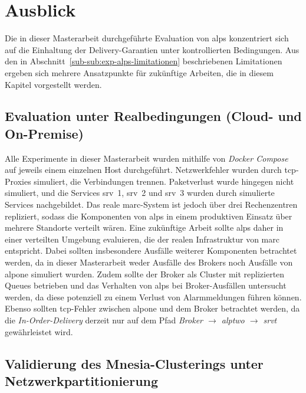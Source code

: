 \chapter{Ausblick}
\label{ch:ausblick}

Die in dieser Masterarbeit durchgeführte Evaluation von \gls{alps} konzentriert sich auf die Einhaltung der Delivery-Garantien unter kontrollierten Bedingungen. Aus den in Abschnitt~\ref{sub-sub:exp-alps-limitationen} beschriebenen Limitationen ergeben sich mehrere Ansatzpunkte für zukünftige Arbeiten, die in diesem Kapitel vorgestellt werden.

\section{Evaluation unter Realbedingungen (Cloud- und On-Premise)}
\label{sec:ausblick-reale-bedingungen}

Alle Experimente in dieser Masterarbeit wurden mithilfe von \textit{Docker Compose} auf jeweils einem einzelnen Host durchgeführt. Netzwerkfehler wurden durch \gls{tcp}-Proxies simuliert, die Verbindungen trennen. Paketverlust wurde hingegen nicht simuliert, und die Services \gls{srv}~1, \gls{srv}~2 und \gls{srv}~3 wurden durch simulierte Services nachgebildet. Das reale \gls{marc}-System ist jedoch über drei Rechenzentren repliziert, sodass die Komponenten von \gls{alps} in einem produktiven Einsatz über mehrere Standorte verteilt wären. Eine zukünftige Arbeit sollte \gls{alps} daher in einer verteilten Umgebung evaluieren, die der realen Infrastruktur von \gls{marc} entspricht. Dabei sollten insbesondere Ausfälle weiterer Komponenten betrachtet werden, da in dieser Masterarbeit weder Ausfälle des Brokers noch Ausfälle von \gls{alpone} simuliert wurden. Zudem sollte der Broker als Cluster mit replizierten Queues betrieben und das Verhalten von \gls{alps} bei Broker-Ausfällen untersucht werden, da diese potenziell zu einem Verlust von Alarmmeldungen führen können. Ebenso sollten \gls{tcp}-Fehler zwischen \gls{alpone} und dem Broker betrachtet werden, da die \textit{In-Order-Delivery} derzeit nur auf dem Pfad \textit{Broker $\rightarrow$ \gls{alptwo} $\rightarrow$ \gls{srvt}} gewährleistet wird.

\newpage

\section{Validierung des Mnesia-Clusterings unter Netzwerkpartitionierung}
\label{sec:ausblick-mnesia}

